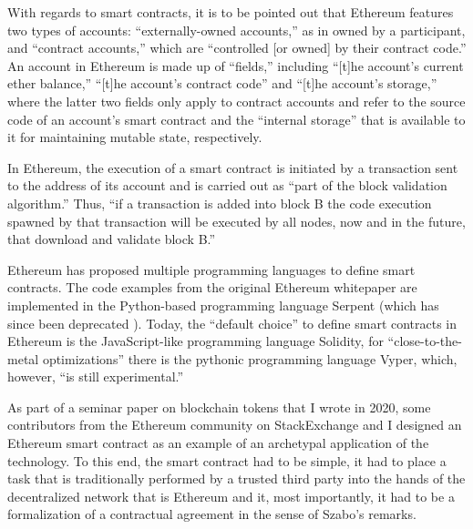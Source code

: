 With regards to smart contracts, it is to be pointed out that Ethereum features two types of accounts:
``externally-owned accounts,'' as in owned by a participant, and ``contract accounts,'' which are ``controlled [or owned] by their contract code.'' \autocite[13]{buterin2013a}
An account in Ethereum is made up of ``fields,'' including ``[t]he account's current ether balance,'' ``[t]he account's contract code'' and ``[t]he account's storage,'' where the latter two fields only apply to contract accounts and refer to the source code of an account's smart contract and the ``internal storage'' that is available to it for maintaining mutable state, respectively. \autocite[13-14]{buterin2013a}

In Ethereum, the execution of a smart contract is initiated by a transaction sent to the address of its account and is carried out as ``part of the block validation algorithm.''
Thus, ``if a transaction is added into block B the code execution spawned by that transaction will be executed by all nodes, now and in the future, that download and validate block B.'' \autocite{buterin2013b}

Ethereum has proposed multiple programming languages to define smart contracts.
The code examples from the original Ethereum whitepaper are implemented in the Python-based programming language Serpent (which has since been deprecated \autocite{buterin2017a}).
Today, the ``default choice'' to define smart contracts in Ethereum is the JavaScript-like programming language Solidity, for ``close-to-the-metal optimizations'' there is the pythonic programming language Vyper, which, however, ``is still experimental.'' \autocite{buterin2017b}

As part of a seminar paper on blockchain tokens \autocite{baerenfaenger2020a} that I wrote in 2020, some contributors from the Ethereum community on StackExchange \autocite{baerenfaenger2020c} and I designed an Ethereum smart contract as an example of an archetypal application of the technology.
To this end, the smart contract had to be simple, it had to place a task that is traditionally performed by a trusted third party into the hands of the decentralized network that is Ethereum and it, most importantly, it had to be a formalization of a contractual agreement in the sense of Szabo's remarks.

